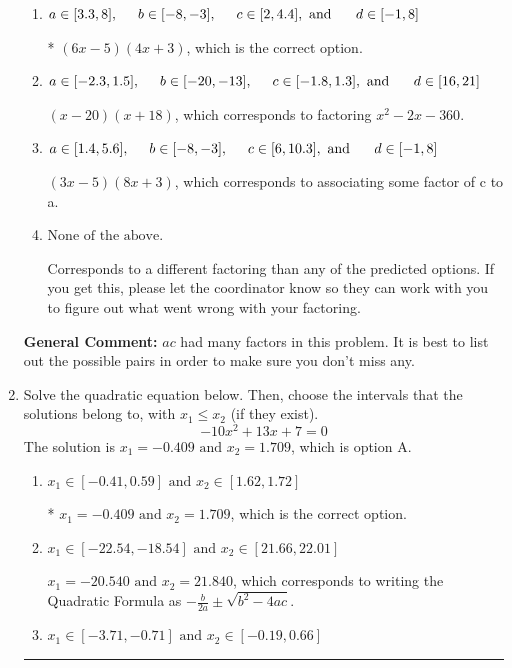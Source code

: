 \documentclass{extbook}[14pt]
\newcommand{\litem}[1]{\item #1

\rule{\textwidth}{0.4pt}}
\begin{document}
\begin{enumerate}
{\begin{enumerate}[label=\Alph*.]
 $(18x -5)(x + 3)$, which corresponds to associating some factor of a to c.
\item \( a \in [3.3, 8], \hspace*{5mm} b \in [-8, -3], \hspace*{5mm} c \in [2, 4.4], \text{ and } \hspace*{5mm} d \in [-1, 8] \)

* $(6x -5)(4x + 3)$, which is the correct option.
\item \( a \in [-2.3, 1.5], \hspace*{5mm} b \in [-20, -13], \hspace*{5mm} c \in [-1.8, 1.3], \text{ and } \hspace*{5mm} d \in [16, 21] \)

 $(x -20)(x + 18)$, which corresponds to factoring $x^{2} -2 x -360$.
\item \( a \in [1.4, 5.6], \hspace*{5mm} b \in [-8, -3], \hspace*{5mm} c \in [6, 10.3], \text{ and } \hspace*{5mm} d \in [-1, 8] \)

 $(3x -5)(8x + 3)$, which corresponds to associating some factor of c to a.
\item \( \text{None of the above.} \)

 Corresponds to a different factoring than any of the predicted options. If you get this, please let the coordinator know so they can work with you to figure out what went wrong with your factoring.
\end{enumerate}

\textbf{General Comment:} $ac$ had many factors in this problem. It is best to list out the possible pairs in order to make sure you don't miss any.
}
\litem{
Solve the quadratic equation below. Then, choose the intervals that the solutions belong to, with $x_1 \leq x_2$ (if they exist).
\[ -10x^{2} +13 x + 7 = 0 \]The solution is \( x_1 = -0.409 \text{ and } x_2 = 1.709 \), which is option A.\begin{enumerate}[label=\Alph*.]
\item \( x_1 \in [-0.41, 0.59] \text{ and } x_2 \in [1.62, 1.72] \)

* $x_1 = -0.409 \text{ and } x_2 = 1.709$, which is the correct option.
\item \( x_1 \in [-22.54, -18.54] \text{ and } x_2 \in [21.66, 22.01] \)

 $x_1 = -20.540 \text{ and } x_2 = 21.840$, which corresponds to writing the Quadratic Formula as $-\frac{b}{2a} \pm \sqrt{b^2 - 4ac}$.
\item \( x_1 \in [-3.71, -0.71] \text{ and } x_2 \in [-0.19, 0.66] \)


\end{enumerate}}
\end{enumerate}
\end{document}
